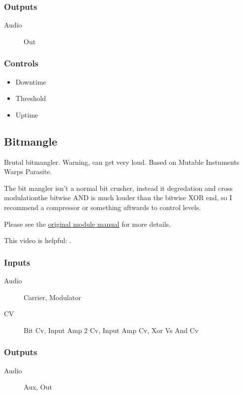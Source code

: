 \subsubsection{Outputs}
\begin{description}
\item [Audio] Out
\end{description}

\subsubsection{Controls}
\begin{itemize}
\item Downtime
\item Threshold
\item Uptime
\end{itemize}

\subsection{Bitmangle}

Brutal bitmangler. Warning, can get very loud. Based on Mutable Instuments Warps Parasite.

The bit mangler isn't a normal bit crusher, instead it degredation and cross modulationthe bitwise AND is much louder than the bitwise XOR end, so I recommend a compressor or something aftwards to control levels.

Please see the \href{https://mqtthiqs.github.io/parasites/warps.html}{original module manual} for more details.

This video is helpful: \url{}.

\subsubsection{Inputs}
\begin{description}
\item [Audio] Carrier, Modulator
\item [CV] Bit Cv, Input Amp 2 Cv, Input Amp Cv, Xor Vs And Cv
\end{description}

\subsubsection{Outputs}
\begin{description}
\item [Audio] Aux, Out
\end{description}

